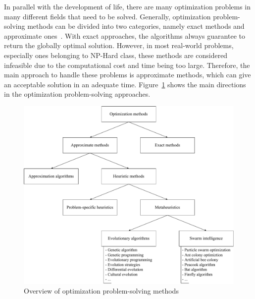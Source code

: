 In parallel with the development of life, there are many optimization problems in many different fields that need to be solved. Generally, optimization problem-solving methods can be divided into two categories, namely exact methods and approximate ones~\cite{talbi2009metaheuristics, eiben2003introduction}. With exact approaches, the algorithms always guarantee to return the globally optimal solution. However, in most real-world problems, especially ones belonging to NP-Hard class, these methods are considered infeasible due to the computational cost and time being too large. Therefore, the main approach to handle these problems is approximate methods, which can give an acceptable solution in an adequate time. Figure~\ref{fig:methos} shows the main directions in the optimization problem-solving approaches.

\setlength{\intextsep}{3pt}
\renewcommand{\scalefigure}{0.55}
\begin{figure}[htbp]
	\centering
	\includegraphics[scale=\scalefigure]{Figures/chap 1/Overview Methods.pdf}
	\caption{Overview of optimization problem-solving methods}
	\label{fig:methos}
\end{figure}

